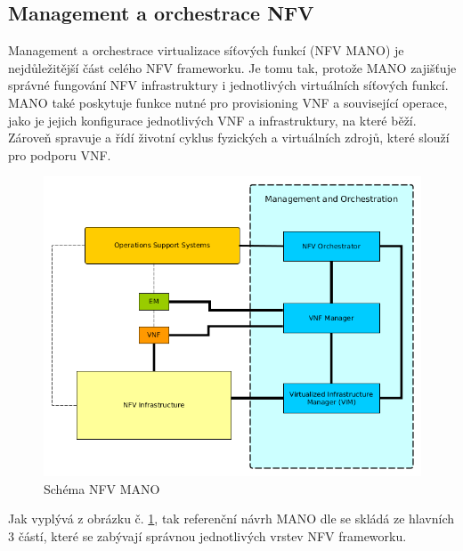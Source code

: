 \subsection{Management a orchestrace NFV}

Management a orchestrace virtualizace síťových funkcí (NFV MANO) je nejdůležitější část celého NFV frameworku. Je tomu tak, protože MANO zajišťuje správné fungování NFV infrastruktury i jednotlivých virtuálních síťových funkcí. MANO také poskytuje funkce nutné pro provisioning VNF a související operace, jako je jejich konfigurace jednotlivých VNF a infrastruktury, na které běží. Zároveň spravuje a řídí životní cyklus fyzických a virtuálních zdrojů, které slouží pro podporu VNF. 

\begin{figure}[h]
\begin{centering}
\includegraphics[scale=0.65]{images/MANO}
\par\end{centering}
\caption{Schéma NFV MANO\label{fig:MANO}}
\end{figure}

Jak vyplývá z obrázku č. \ref{fig:MANO}, tak referenční návrh MANO dle \cite{NFV_MANO} se skládá ze hlavních 3 částí, které se zabývají správnou jednotlivých vrstev NFV frameworku.

